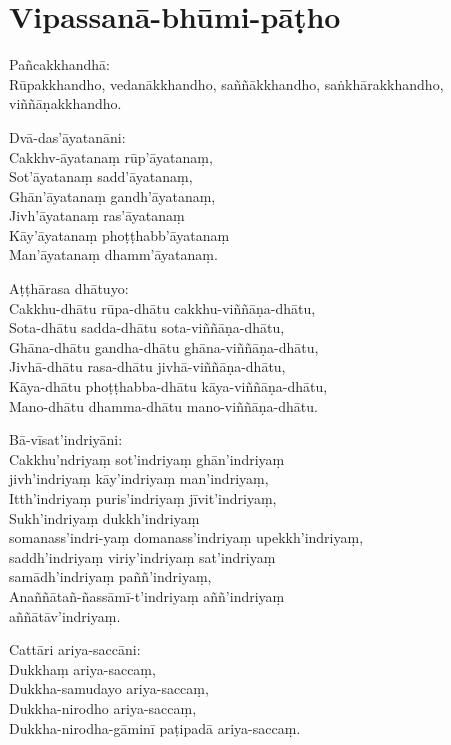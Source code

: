 
\section{Vipassanā-bhūmi-pāṭho}


Pañcakkhandhā:\\
Rūpakkhandho, vedanākkhandho, saññākkhandho, saṅkhārakkhandho, viññāṇakkhandho.

Dvā-das'āyatanāni:\\
Cakkhv-āyatanaṃ rūp'āyatanaṃ,\\
Sot'āyatanaṃ sadd'āyatanaṃ,\\
Ghān'āyatanaṃ gandh'āyatanaṃ,\\
Jivh'āyatanaṃ ras'āyatanaṃ\\
Kāy'āyatanaṃ phoṭṭhabb'āyatanaṃ\\
Man'āyatanaṃ dhamm'āyatanaṃ.

Aṭṭhārasa dhātuyo:\\
Cakkhu-dhātu rūpa-dhātu cakkhu-viññāṇa-dhātu,\\
Sota-dhātu sadda-dhātu sota-viññāṇa-dhātu,\\
Ghāna-dhātu gandha-dhātu ghāna-viññāṇa-dhātu,\\
Jivhā-dhātu rasa-dhātu jivhā-viññāṇa-dhātu,\\
Kāya-dhātu phoṭṭhabba-dhātu kāya-viññāṇa-dhātu,\\
Mano-dhātu dhamma-dhātu mano-viññāṇa-dhātu.

Bā-vīsat'indriyāni:\\
Cakkhu'ndriyaṃ sot'indriyaṃ ghān'indriyaṃ\\
jivh'indriyaṃ kāy'indriyaṃ man'indriyaṃ,\\
Itth'indriyaṃ puris'indriyaṃ jīvit'indriyaṃ,\\
Sukh'indriyaṃ dukkh'indriyaṃ\\
somanass'indri-yaṃ domanass'indriyaṃ upekkh'indriyaṃ,\\
saddh'indriyaṃ viriy'indriyaṃ sat'indriyaṃ\\
samādh'indriyaṃ paññ'indriyaṃ,\\
Anaññātañ-ñassāmī-t'indriyaṃ aññ'indriyaṃ\\
aññātāv'indriyaṃ.

Cattāri ariya-saccāni:\\
Dukkhaṃ ariya-saccaṃ,\\
Dukkha-samudayo ariya-saccaṃ,\\
Dukkha-nirodho ariya-saccaṃ,\\
Dukkha-nirodha-gāminī paṭipadā ariya-saccaṃ.

